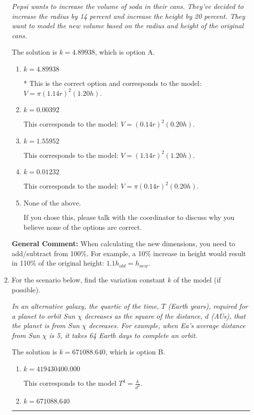 \documentclass{extbook}[14pt]
\newcommand{\litem}[1]{\item #1

\rule{\textwidth}{0.4pt}}
\begin{document}
\begin{enumerate}
{\begin{center}
    \textit{ Pepsi wants to increase the volume of soda in their cans. They've decided to increase the radius by 14 percent and increase the height by 20 percent. They want to model the new volume based on the radius and height of the original cans. }
\end{center}
The solution is \( k = 4.89938 \), which is option A.\begin{enumerate}[label=\Alph*.]
\item \( k = 4.89938 \)

* This is the correct option and corresponds to the model: $V = \pi (1.14 r)^2 (1.20 h)$.
\item \( k = 0.00392 \)

This corresponds to the model: $V = (0.14 r)^2 (0.20 h)$.
\item \( k = 1.55952 \)

This corresponds to the model: $V = (1.14 r)^2 (1.20 h)$.
\item \( k = 0.01232 \)

This corresponds to the model: $V = \pi (0.14 r)^2 (0.20 h)$.
\item \( \text{None of the above.} \)

If you chose this, please talk with the coordinator to discuss why you believe none of the options are correct.
\end{enumerate}

\textbf{General Comment:} When calculating the new dimensions, you need to add/subtract from 100\%. For example, a 10\% increase in height would result in 110\% of the original height: $1.1h_{old} = h_{new}$.
}
\litem{
For the scenario below, find the variation constant $k$ of the model (if possible).

\begin{center}
    \textit{ In an alternative galaxy, the quartic of the time, $T$ (Earth years), required for a planet to orbit Sun $\chi$ decreases as the square of the distance, $d$ (AUs), that the planet is from Sun $\chi$ decreases. For example, when Ea's average distance from Sun $\chi$ is 5, it takes 64 Earth days to complete an orbit. }
\end{center}
The solution is \( k = 671088.640 \), which is option B.\begin{enumerate}[label=\Alph*.]
\item \( k = 419430400.000 \)

This corresponds to the model $T^{4} = \frac{k}{d^{2}}$.
\item \( k = 671088.640 \)


\end{enumerate}}
\end{enumerate}
\end{document}
